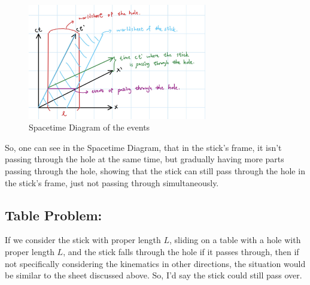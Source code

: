 \documentclass{article}
\begin{document}
\begin{figure}[h!]
    \begin{center}
        \includegraphics[width=78mm]{hw4 q41.jpg}
        \caption{Spacetime Diagram of the events}
    \end{center}
\end{figure}

So, one can see in the Spacetime Diagram, that in the stick's frame, it isn't passing through the hole at the same time, but gradually having more parts passing through the hole, showing that the stick can still pass through the hole in the stick's frame, just not passing through simultaneously.

\subsection*{Table Problem:}
If we consider the stick with proper length $L$, sliding on a table with a hole with proper length $L$, and the stick falls through the hole if it passes through, then if not specifically considering the kinematics in other directions, the situation would be similar to the sheet discussed above. So, I'd say the stick could still pass over. 

\break
\end{document}
